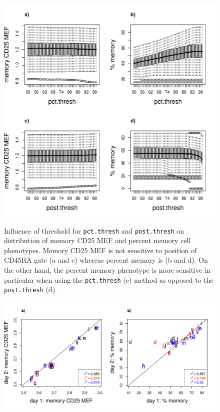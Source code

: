 \begin{figure}
\centering
\begin{minipage}{.6\textwidth}
\includegraphics[width=\textwidth]{figures/cd45raneg-memory-gate-phenotype-sensitivity.pdf}
\end{minipage}
{ Influence of threshold for \texttt{pct.thresh} and \texttt{post.thresh} on distribution of memory CD25 MEF and percent memory cell phenotypes. }
{
  Memory CD25 MEF is not sensitive to position of CD45RA gate (a and c) whereas percent memory is (b and d).
  On the other hand, the percent memory phenotype is more sensitive in particular when using the \texttt{pct.thresh} (c)
  method as opposed to the \texttt{post.thresh} (d).
}
\begin{minipage}{.7\textwidth}
\includegraphics[width=\textwidth]{figures/repeatability-memory-thresholds.pdf}

\end{minipage}
\end{figure}
